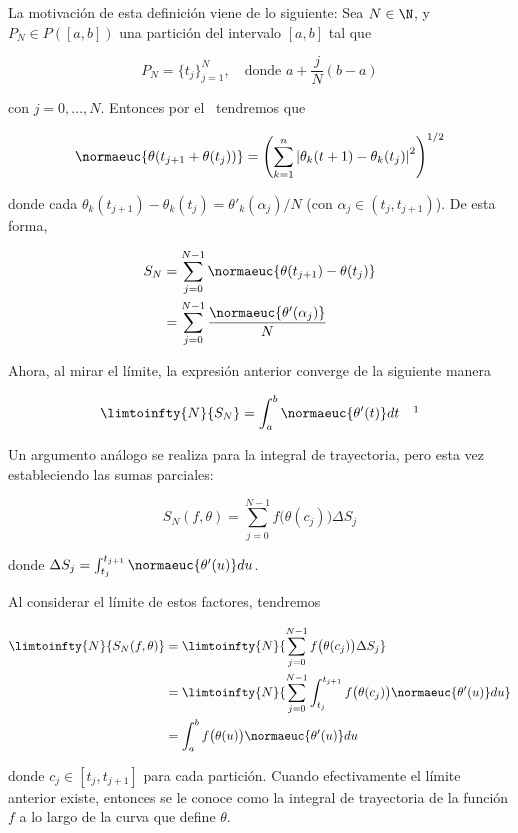 La motivación de esta definición viene de lo siguiente: Sea $N \in \N$, y $P_N \in P([a,b])$ una partición del intervalo $[a,b]$ tal que

\[
P_N = \{t_j\}_{j=1}^N, \quad \text{donde $a + \frac{j}{N}(b-a)$}
\]

\noindent con $j = 0, \dots, N$. Entonces por el \TVM~tendremos que

\[
\normaeuc{\theta(t_{j+1} + \theta(t_j))} = \left( \sum_{k=1}^n \left| \theta_k(t+1) - \theta_k(t_j) \right|^2 \right)^{1/2}
\]

\noindent donde cada $\theta_k(t_{j+1}) - \theta_k(t_j) = \theta'_k(\alpha_j)/N$ (con $\alpha_j \in (t_j, t_{j+1})$). De esta forma,

\begin{align*}
    S_N &= \sum_{j=0}^{N-1} \normaeuc{\theta(t_{j+1}) - \theta(t_j)} \\
        &= \sum_{j=0}^{N-1} \frac{\normaeuc{\theta'(\alpha_j)}}{N} 
\end{align*}

Ahora, al mirar el límite, la expresión anterior converge de la siguiente manera

\[
\limtoinfty{N}{S_N} = \int_a^b \normaeuc{\theta'(t)}dt \quad \footnotemark
\]

Un argumento análogo se realiza para la integral de trayectoria, pero esta vez estableciendo las sumas parciales:

\[
S_N(f, \theta) = \sum_{j=0}^{N-1} f \big( \theta(c_j) \big) \Delta S_j
\]

\noindent donde $\Delta S_j = \int_{t_j}^{t_{j+1}} \normaeuc{\theta'(u)} du$.

Al considerar el límite de estos factores, tendremos

\begin{align*}
    \limtoinfty{N}{S_N(f, \theta)} &= \limtoinfty{N}{\sum_{j=0}^{N-1} f \big( \theta(c_j) \big) \Delta S_j} \\
        &= \limtoinfty{N}{\sum_{j=0}^{N-1} \int_{t_j}^{t_{j+1}} f\big( \theta(c_j) \big) \normaeuc{\theta'(u)}du} \\
        &= \int_a^b f \big( \theta(u) \big) \normaeuc{\theta'(u)}du
\end{align*}

\noindent donde $c_j \in [t_j, t_{j+1}]$ para cada partición. Cuando efectivamente el límite anterior existe, entonces se le conoce como la integral de trayectoria de la función $f$ a lo largo de la curva que define $\theta$.

